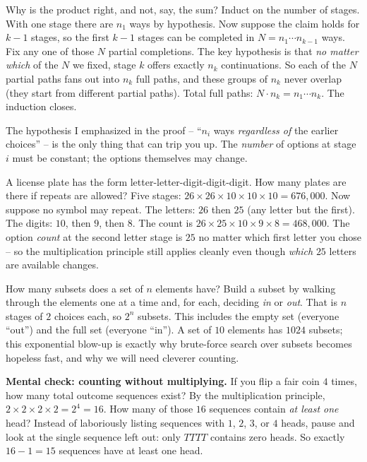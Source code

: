 \begin{whybox}
Why is the product right, and not, say, the sum? Induct on the number of stages. With one
stage there are $n_1$ ways by hypothesis. Now suppose the claim holds for $k-1$ stages, so the
first $k-1$ stages can be completed in $N = n_1 \cdots n_{k-1}$ ways. Fix any one of those
$N$ partial completions. The key hypothesis is that \emph{no matter which} of the $N$
we fixed, stage $k$ offers exactly $n_k$ continuations. So each of the $N$ partial paths
fans out into $n_k$ full paths, and these groups of $n_k$ never overlap (they start from
different partial paths). Total full paths: $N \cdot n_k = n_1 \cdots n_k$. The induction
closes.
\end{whybox}

The hypothesis I emphasized in the proof -- ``$n_i$ ways \emph{regardless of} the earlier
choices'' -- is the only thing that can trip you up. The \emph{number} of options at stage
$i$ must be constant; the options themselves may change.

\begin{example}
\label{ch2:ex-plates}
A license plate has the form letter-letter-digit-digit-digit. How many plates are there
if repeats are allowed? Five stages: $26 \times 26 \times 10 \times 10 \times 10 =
676{,}000$. Now suppose no symbol may repeat. The letters: $26$ then $25$ (any letter but
the first). The digits: $10$, then $9$, then $8$. The count is $26 \times 25 \times 10
\times 9 \times 8 = 468{,}000$. The option \emph{count} at the second letter stage
is $25$ no matter which first letter you chose -- so the multiplication principle still
applies cleanly even though \emph{which} $25$ letters are available changes.
\end{example}

\begin{example}
\label{ch2:ex-subsets}
How many subsets does a set of $n$ elements have? Build a subset by walking through the
elements one at a time and, for each, deciding \emph{in} or \emph{out}. That is $n$ stages
of $2$ choices each, so $2^n$ subsets. This includes the empty set (everyone ``out'') and
the full set (everyone ``in''). A set of $10$ elements has $1024$ subsets; this exponential
blow-up is exactly why brute-force search over subsets becomes hopeless fast, and why we
will need cleverer counting.
\end{example}

\begin{recoverybox}
\textbf{Mental check: counting without multiplying.} If you flip a fair coin $4$ times, how
many total outcome sequences exist? By the multiplication principle, $2 \times 2 \times 2 \times 2 = 2^4 = 16$.
How many of those $16$ sequences contain \emph{at least one} head?
Instead of laboriously listing sequences with $1$, $2$, $3$, or $4$ heads, pause and look at the
single sequence left out: only $TTTT$ contains zero heads.
So exactly $16 - 1 = 15$ sequences have at least one head.
\end{recoverybox}

